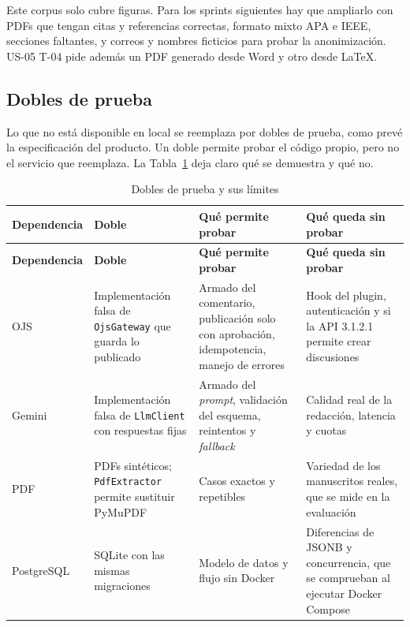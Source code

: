 Este corpus solo cubre figuras. Para los sprints siguientes hay que ampliarlo con PDFs que tengan citas y referencias correctas, formato mixto APA e IEEE, secciones faltantes, y correos y nombres ficticios para probar la anonimización. US-05 T-04 pide además un PDF generado desde Word y otro desde LaTeX.

\subsection{Dobles de prueba}

Lo que no está disponible en local se reemplaza por dobles de prueba, como prevé la especificación del producto. Un doble permite probar el código propio, pero no el servicio que reemplaza. La Tabla~\ref{tab:3-11} deja claro qué se demuestra y qué no.

{\small
\begin{longtable}{@{}>{\raggedright\arraybackslash}p{}>{\raggedright\arraybackslash}p{}>{\raggedright\arraybackslash}p{}>{\raggedright\arraybackslash}p{}@{}}
\caption{Dobles de prueba y sus límites}\label{tab:3-11}\\
\toprule
\textbf{Dependencia} & \textbf{Doble} & \textbf{Qué permite probar} & \textbf{Qué queda sin probar} \\
\midrule
\endfirsthead
\toprule
\textbf{Dependencia} & \textbf{Doble} & \textbf{Qué permite probar} & \textbf{Qué queda sin probar} \\
\midrule
\endhead
\bottomrule
\endfoot
\endlastfoot
OJS & Implementación falsa de \texttt{OjsGateway} que guarda lo publicado & Armado del comentario, publicación solo con aprobación, idempotencia, manejo de errores & Hook del plugin, autenticación y si la API 3.1.2.1~\cite{ref35} permite crear discusiones \\
Gemini & Implementación falsa de \texttt{LlmClient} con respuestas fijas & Armado del \emph{prompt}, validación del esquema, reintentos y \emph{fallback} & Calidad real de la redacción, latencia y cuotas \\
PDF & PDFs sintéticos; \texttt{PdfExtractor} permite sustituir PyMuPDF & Casos exactos y repetibles & Variedad de los manuscritos reales, que se mide en la evaluación \\
PostgreSQL & SQLite con las mismas migraciones & Modelo de datos y flujo sin Docker & Diferencias de JSONB y concurrencia, que se comprueban al ejecutar Docker Compose \\
\end{longtable}
}

